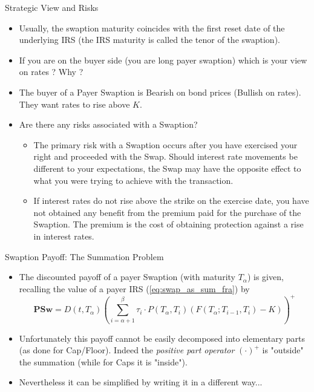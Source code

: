 \documentclass{beamer}
\begin{document}
\begin{frame}{Strategic View and Risks}
\begin{itemize}
\item<1-> Usually, the swaption maturity coincides with the first reset date of the underlying IRS (the IRS maturity is called the \textcolor{maincolor}{tenor} of the swaption).
\item<1-> If you are on the buyer side (you are long payer swaption) which is your view on rates ? Why ?
\item<2-> The buyer of a Payer Swaption is Bearish on bond prices (Bullish on rates). They want rates to rise above $K$.
\item<3-> Are there any risks associated with a Swaption?
\begin{itemize}
	\item<4-> The primary risk with a Swaption occurs after you have exercised your right and proceeded with the Swap. Should interest rate movements be different to your expectations, the Swap may have the opposite effect to what you were trying to achieve with the transaction.
	\item<5-> If interest rates do not rise above the strike on the exercise date, you have not obtained any benefit from the premium paid for the purchase of the Swaption. The premium is the cost of obtaining protection against a rise in interest rates.
\end{itemize}
\end{itemize}
\end{frame}

\begin{frame}{Swaption Payoff: The Summation Problem}
\begin{itemize}
\item<1-> The discounted payoff of a payer Swaption (with maturity $T_\alpha$) is given, recalling the value of a payer IRS (\cref{eq:swap_as_sum_fra}) by
\begin{equation}
	\textbf{PSw}=D(t,T_\alpha)\left(\sum_{i=\alpha+1}^\beta \tau_i\cdot P(T_\alpha,T_i) (F(T_\alpha;T_{i-1},T_i) - K)\right)^+
	\label{eq:swaption_payoff_std}
\end{equation}
\item<2-> Unfortunately this payoff \textcolor{maincolor}{cannot} be easily decomposed into elementary parts (as done for Cap/Floor). Indeed the \emph{positive part operator} $(\cdot)^+$ is "outside" the summation (while for Caps it is "inside").
\item<3-> Nevertheless it can be simplified by writing it in a different way...
\end{itemize}
\end{frame}
\end{document}
